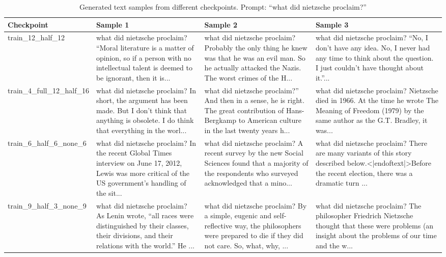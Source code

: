 \begin{table}[htbp]
\centering
\small
\begin{tabular}{|l|p{4.5cm}|p{4.5cm}|p{4.5cm}|}
\hline
Checkpoint & Sample 1 & Sample 2 & Sample 3 \\
\hline
train\_12\_half\_12 & what did nietzsche proclaim? “Moral literature is a matter of opinion, so if a person with no intellectual talent is deemed to be ignorant, then it is... & what did nietzsche proclaim? Probably the only thing he knew was that he was an evil man. So he actually attacked the Nazis. The worst crimes of the H... & what did nietzsche proclaim? “No, I don’t have any idea. No, I never had any time to think about the question. I just couldn’t have thought about it.”... \\
\hline
train\_4\_full\_12\_half\_16 & what did nietzsche proclaim? In short, the argument has been made. But I don’t think that anything is obsolete. I do think that everything in the worl... & what did nietzsche proclaim?” And then in a sense, he is right. The great contribution of Hans-Bergkamp to American culture in the last twenty years h... & what did nietzsche proclaim? Nietzsche died in 1966. At the time he wrote The Meaning of Freedom (1979) by the same author as the G.T. Bradley, it was... \\
\hline
train\_6\_half\_6\_none\_6 & what did nietzsche proclaim? In the recent Global Times interview on June 17, 2012, Lewis was more critical of the US government’s handling of the sit... & what did nietzsche proclaim? A recent survey by the new Social Sciences found that a majority of the respondents who surveyed acknowledged that a mino... & what did nietzsche proclaim? There are many variants of this story described below.<|endoftext|>Before the recent election, there was a dramatic turn ... \\
\hline
train\_9\_half\_3\_none\_9 & what did nietzsche proclaim? As Lenin wrote, “all races were distinguished by their classes, their divisions, and their relations with the world.” He ... & what did nietzsche proclaim? By a simple, eugenic and self-reflective way, the philosophers were prepared to die if they did not care. So, what, why, ... & what did nietzsche proclaim? The philosopher Friedrich Nietzsche thought that these were problems (an insight about the problems of our time and the w... \\
\hline
\end{tabular}
\caption{Generated text samples from different checkpoints. Prompt: ``what did nietzsche proclaim?''}
\label{tab:samples}
\end{table}